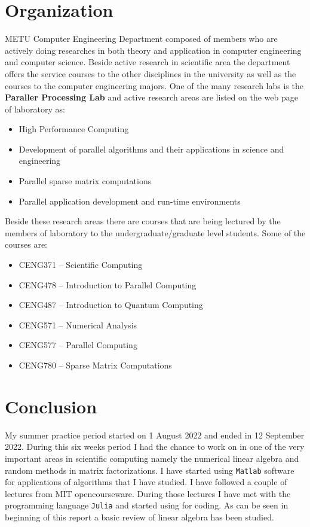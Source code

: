 \documentclass[11pt,a4paper]{article}
\theoremstyle{definition}
\begin{document}
	\section{Organization}
	METU Computer Engineering Department composed of members who are actively doing researches in both theory and application in computer engineering and computer science. Beside active research in scientific area the department offers the service courses to the other disciplines in the university as well as the courses to the computer engineering majors. One of the many research labs is the \textbf{Paraller Processing Lab} and active research areas are listed on the web page of laboratory as:
		\begin{itemize}
			\item High Performance Computing
			\item Development of parallel algorithms and their applications in science and engineering
			\item Parallel sparse matrix computations
			\item Parallel application development and run-time environments
		\end{itemize}
		Beside these research areas there are courses that are being lectured by the members of laboratory to the undergraduate/graduate level students. Some of the courses are:
		\begin{itemize}
			\item CENG371 – Scientific Computing
			\item CENG478 – Introduction to Parallel Computing
			\item CENG487 – Introduction to Quantum Computing
			\item CENG571 – Numerical Analysis
			\item CENG577 – Parallel Computing
			\item CENG780 – Sparse Matrix Computations
		\end{itemize}

	\section{Conclusion}
	My summer practice period started on 1 August 2022 and ended in 12 September 2022. During this six weeks period I had the chance to work on in one of the very important areas in scientific computing namely the numerical linear algebra and random methods in matrix factorizations. I have started using \texttt{Matlab} software for applications of algorithms that I have studied. I have followed a couple of lectures from MIT opencourseware. During those lectures I have met with the programming language \texttt{Julia} and started using for coding. As can be seen in beginning of this report a basic review of linear algebra has been studied.
	
\end{document}
